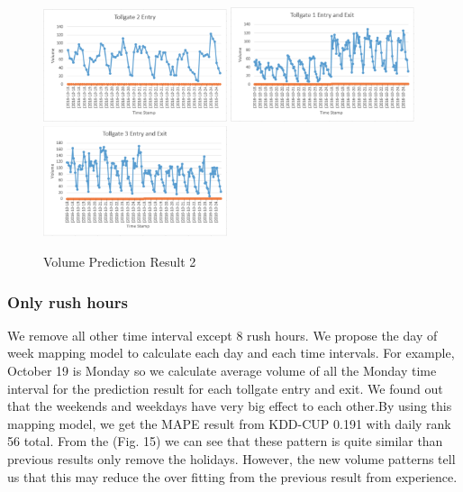 \documentclass[journal, letterpaper]{IEEEtran}
\begin{document}
\begin{figure} [H]
  \centering
  \includegraphics[width=0.48\textwidth]{t2_2.png}
  \includegraphics[width=0.48\textwidth]{t1_2.png}
  \includegraphics[width=0.48\textwidth]{t3_2.png}
  \caption{Volume Prediction Result 2}
  \label{fig:14}
\end{figure}

\subsubsection{Only rush hours}
We remove all other time interval except 8 rush hours. We propose the day of week mapping model to calculate each day and each time intervals. For example, October 19 is Monday so we calculate average volume of all the Monday time interval for the prediction result for each tollgate entry and exit. We found out that the weekends and weekdays have very big effect to each other.By using this mapping model, we get the MAPE result from KDD-CUP 0.191 with daily rank 56 total. From the (Fig. 15) we can see that these pattern is quite similar than previous results only remove the holidays. However, the new volume patterns tell us that this may reduce the over fitting from the previous result from experience. 
\end{document}
